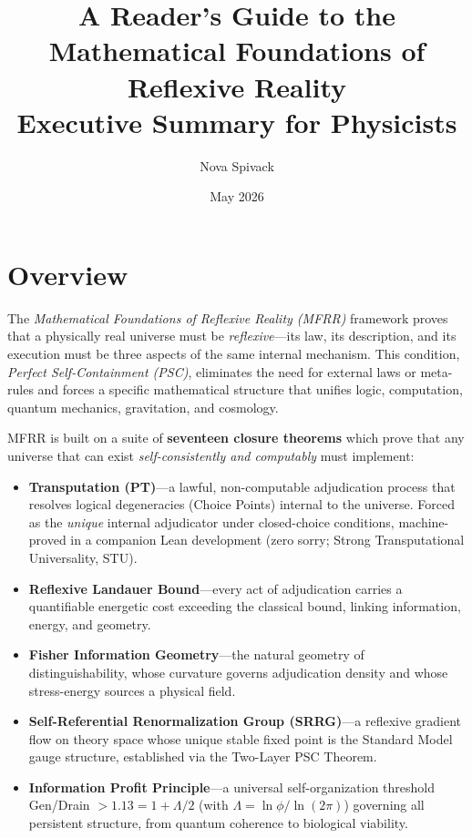 \documentclass[11pt]{article}
\title{A Reader's Guide to the Mathematical Foundations of Reflexive Reality\\[6pt]
\large Executive Summary for Physicists}
\author{Nova Spivack}
\date{May 2026}
\begin{document}
\maketitle
\NovaZenodoAfterTitle

\section*{Overview}

The \emph{Mathematical Foundations of Reflexive Reality (MFRR)} framework proves that a
physically real universe must be \emph{reflexive}---its law, its description, and its execution
must be three aspects of the same internal mechanism.
This condition, \emph{Perfect Self-Containment (PSC)}, eliminates the need for external laws
or meta-rules and forces a specific mathematical structure that unifies logic, computation,
quantum mechanics, gravitation, and cosmology.

MFRR is built on a suite of \textbf{seventeen closure theorems} which prove that any universe
that can exist \emph{self-consistently and computably} must implement:

\begin{itemize}
    \item \textbf{Transputation (PT)}---a lawful, non-computable adjudication process that resolves
    logical degeneracies (Choice Points) internal to the universe. Forced as the \emph{unique}
    internal adjudicator under closed-choice conditions, machine-proved in a companion Lean
    development (zero sorry; Strong Transputational Universality, STU).
    \item \textbf{Reflexive Landauer Bound}---every act of adjudication carries a quantifiable
    energetic cost exceeding the classical bound, linking information, energy, and geometry.
    \item \textbf{Fisher Information Geometry}---the natural geometry of distinguishability,
    whose curvature governs adjudication density and whose stress-energy sources a physical field.
    \item \textbf{Self-Referential Renormalization Group (SRRG)}---a reflexive gradient flow
    on theory space whose unique stable fixed point is the Standard Model gauge structure,
    established via the Two-Layer PSC Theorem.
    \item \textbf{Information Profit Principle}---a universal self-organization threshold
    Gen/Drain $> 1.13 = 1 + \Lambda/2$ (with $\Lambda = \ln\phi/\ln(2\pi)$) governing all
    persistent structure, from quantum coherence to biological viability.
\end{itemize}
\end{document}
